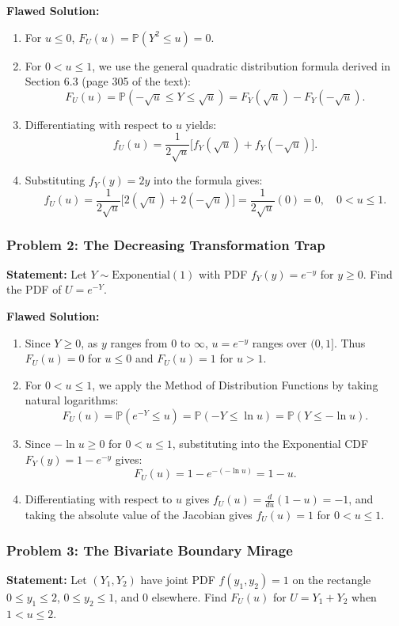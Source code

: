 \documentclass[11pt, letterpaper]{article}
\theoremstyle{definition}
\theoremstyle{remark}
\newcommand{\Prob}{\mathbb{P}}
\begin{document}
\textbf{Flawed Solution:}
\begin{enumerate}[label=Step \arabic*:]
    \item For $u \le 0$, $F_U(u) = \Prob(Y^2 \le u) = 0$.
    \item For $0 < u \le 1$, we use the general quadratic distribution formula derived in Section 6.3 (page 305 of the text):
    \[
        F_U(u) = \Prob(-\sqrt{u} \le Y \le \sqrt{u}) = F_Y(\sqrt{u}) - F_Y(-\sqrt{u}).
    \]
    \item Differentiating with respect to $u$ yields:
    \[
        f_U(u) = \frac{1}{2\sqrt{u}}\Big[ f_Y(\sqrt{u}) + f_Y(-\sqrt{u}) \Big].
    \]
    \item Substituting $f_Y(y) = 2y$ into the formula gives:
    \[
        f_U(u) = \frac{1}{2\sqrt{u}}\Big[ 2(\sqrt{u}) + 2(-\sqrt{u}) \Big] = \frac{1}{2\sqrt{u}}(0) = 0, \quad 0 < u \le 1.
    \]
\end{enumerate}

\hrulefill

\subsubsection*{Problem 2: The Decreasing Transformation Trap}
\textbf{Statement:} Let $Y \sim \text{Exponential}(1)$ with PDF $f_Y(y) = e^{-y}$ for $y \ge 0$. Find the PDF of $U = e^{-Y}$.

\textbf{Flawed Solution:}
\begin{enumerate}[label=Step \arabic*:]
    \item Since $Y \ge 0$, as $y$ ranges from $0$ to $\infty$, $u = e^{-y}$ ranges over $(0, 1]$. Thus $F_U(u) = 0$ for $u \le 0$ and $F_U(u) = 1$ for $u > 1$.
    \item For $0 < u \le 1$, we apply the Method of Distribution Functions by taking natural logarithms:
    \[
        F_U(u) = \Prob(e^{-Y} \le u) = \Prob(-Y \le \ln u) = \Prob(Y \le -\ln u).
    \]
    \item Since $-\ln u \ge 0$ for $0 < u \le 1$, substituting into the Exponential CDF $F_Y(y) = 1 - e^{-y}$ gives:
    \[
        F_U(u) = 1 - e^{-(-\ln u)} = 1 - u.
    \]
    \item Differentiating with respect to $u$ gives $f_U(u) = \frac{d}{du}(1 - u) = -1$, and taking the absolute value of the Jacobian gives $f_U(u) = 1$ for $0 < u \le 1$.
\end{enumerate}

\hrulefill

\subsubsection*{Problem 3: The Bivariate Boundary Mirage}
\textbf{Statement:} Let $(Y_1, Y_2)$ have joint PDF $f(y_1, y_2) = 1$ on the rectangle $0 \le y_1 \le 2$, $0 \le y_2 \le 1$, and $0$ elsewhere. Find $F_U(u)$ for $U = Y_1 + Y_2$ when $1 < u \le 2$.
\end{document}
